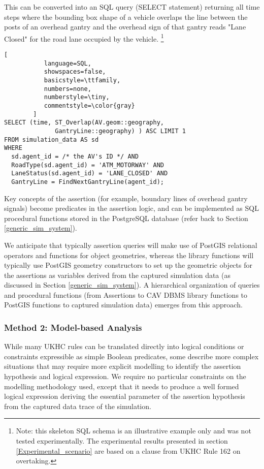 \begin{itemize}
         This can be converted into an SQL query (SELECT statement) returning all time steps where the bounding box shape of a vehicle overlaps the line between the posts of an overhead gantry and the overhead sign of that gantry reads "Lane Closed" for the road lane occupied by the vehicle.      
         \footnote{Note: this skeleton SQL schema is an illustrative example only and was not tested experimentally. The experimental results presented in section \ref{Experimental_scenario} are based on a clause from UKHC Rule 162 on overtaking.}\\
\scriptsize    %
\begin{lstlisting}[
           language=SQL,
           showspaces=false,
           basicstyle=\ttfamily,
           numbers=none,
           numberstyle=\tiny,
           commentstyle=\color{gray}
        ]
SELECT (time, ST_Overlap(AV.geom::geography,
    	      GantryLine::geography) ) ASC LIMIT 1
FROM simulation_data AS sd
WHERE
  sd.agent_id = /* the AV's ID */ AND
  RoadType(sd.agent_id) = 'ATM_MOTORWAY' AND
  LaneStatus(sd.agent_id) = 'LANE_CLOSED' AND
  GantryLine = FindNextGantryLine(agent_id);
\end{lstlisting}
\normalsize %
Key concepts of the assertion (for example, boundary lines of overhead gantry signals) become predicates in the assertion logic, and can be implemented as SQL procedural functions stored in the PostgreSQL database (refer back to Section \ref{generic_sim_system}).

We anticipate that typically assertion queries will make use of PostGIS relational operators and functions for object geometries, whereas the library functions will typically use PostGIS geometry constructors to set up the geometric objects for the assertions as variables derived from the captured simulation data (as discussed in Section \ref{generic_sim_system}). A hierarchical organization of queries and procedural functions (from Assertions to CAV DBMS library functions to PostGIS functions to captured simulation data) emerges from this approach.\\
\end{itemize}

\subsubsection{Method 2: Model-based Analysis} \label{model_based_analysis}

While many UKHC rules can be translated directly into logical conditions or constraints expressible as simple Boolean predicates, some describe more complex situations that may require more explicit modelling to identify the assertion hypothesis and logical expression. We require no particular constraints on the modelling methodology used, except that it needs to produce a well formed logical expression deriving the essential parameter of the assertion hypothesis from the captured data trace of the simulation.

